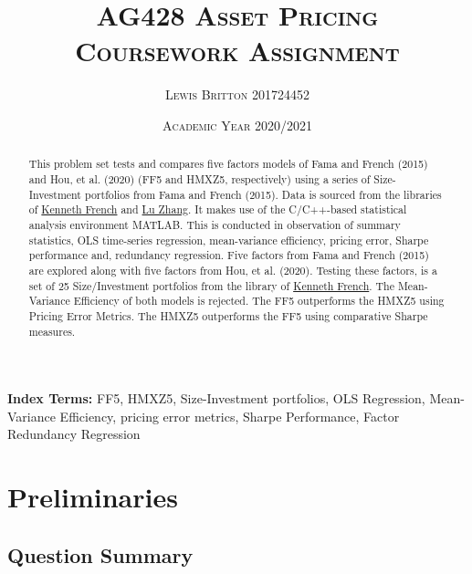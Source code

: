 \documentclass[11pt, english]{article}
\begin{document}

	\title{\textsc{AG428 Asset Pricing\\ Coursework Assignment}}
	\author{\textsc{Lewis Britton 201724452}}
	\date{\textsc{Academic Year 2020/2021}}
	\maketitle

	\begin{abstract}
		This problem set tests and compares five factors models of Fama and French (2015) and Hou, et al. (2020) (FF5 and HMXZ5, respectively) using a series of Size-Investment portfolios from Fama and French (2015). Data is sourced from the libraries of \href{http://mba.tuck.dartmouth.edu/pages/faculty/ken.french/data_library.html}{Kenneth French} and \href{http://global-q.org/index.html}{Lu Zhang}. It makes use of the C/C++-based statistical analysis environment MATLAB. This is conducted in observation of summary statistics, OLS time-series regression, mean-variance efficiency, pricing error, Sharpe performance and, redundancy regression. Five factors from Fama and French (2015) are explored along with five factors from Hou, et al. (2020). Testing these factors, is a set of 25 Size/Investment portfolios from the library of \href{http://mba.tuck.dartmouth.edu/pages/faculty/ken.french/data_library.html}{Kenneth French}. The Mean-Variance Efficiency of both models is rejected. The FF5 outperforms the HMXZ5 using Pricing Error Metrics. The HMXZ5 outperforms the FF5 using comparative Sharpe measures.
	\end{abstract}

	\textbf{Index Terms: }FF5, HMXZ5, Size-Investment portfolios, OLS Regression, Mean-Variance Efficiency, pricing error metrics, Sharpe Performance, Factor Redundancy Regression

\newpage


	\renewcommand{\contentsname}{Table of Contents}

	\tableofcontents

\newpage

\section*{Preliminaries}

	\subsection*{Question Summary}
\end{document}
